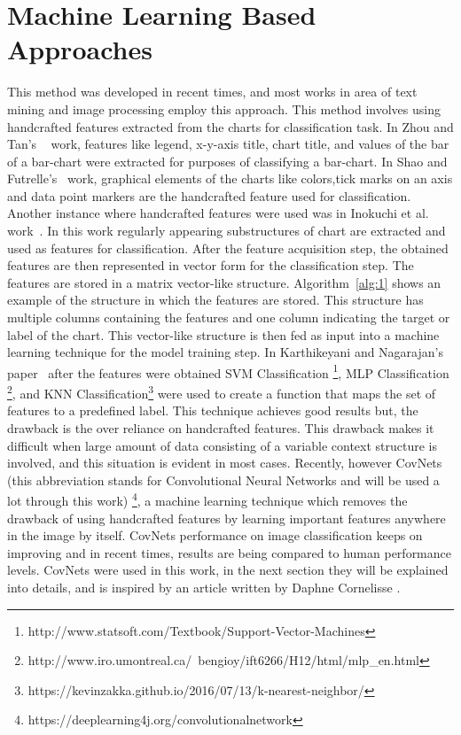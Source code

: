 \documentclass[12pt, a4paper,oneside]{report}
\begin{document}
\section{Machine Learning Based Approaches}
This method was developed in recent times, and most works in area of text mining and image processing employ this approach. This method 
involves using handcrafted features extracted from the charts for classification task. In Zhou and Tan's ~\cite{zhou2000bar} work, features like legend, x-y-axis title, chart title, and values of the bar of a bar-chart were extracted for purposes of classifying a bar-chart. In Shao and  Futrelle's~\cite{shao2005recognition} work, graphical elements of the charts like colors,tick marks on an axis and data point markers are the handcrafted feature used for classification. Another instance where handcrafted features were used was in Inokuchi et al. work~\cite{inokuchi2000apriori}. In this work regularly appearing substructures of chart are extracted and used as features for classification. After the feature acquisition step, the obtained features are then represented in vector form for the classification step. The features are stored in a matrix vector-like structure. Algorithm~\ref{alg:1} shows an example of the structure in which the features are stored. This structure has multiple columns containing the features and one column indicating the target or label of the chart. This vector-like structure is then fed as input into a machine learning technique for the model training step. In Karthikeyani and Nagarajan's paper~\cite{karthikeyani2012machine} after the features were obtained SVM Classification \footnote{http://www.statsoft.com/Textbook/Support-Vector-Machines}, MLP Classification
\footnote{http://www.iro.umontreal.ca/~bengioy/ift6266/H12/html/mlp\_en.html}, and  KNN Classification\footnote{
https://kevinzakka.github.io/2016/07/13/k-nearest-neighbor/} were used to create a function that maps the set of features to a predefined label. This technique achieves good results but, the drawback is the over reliance on handcrafted features. This drawback makes it difficult when large amount of data consisting of a variable context structure is involved, and this situation is evident in most cases. Recently, however CovNets (this abbreviation stands for Convolutional Neural Networks and will be used a lot through this work) \footnote{https://deeplearning4j.org/convolutionalnetwork}, a machine learning technique which removes the drawback of using handcrafted features by learning important features anywhere in the image by itself. CovNets performance on image classification keeps on improving and in recent times, results are being compared to human performance levels. CovNets were used in this work, in the next section they will be explained into details, and is inspired by an article written by Daphne Cornelisse \cite{covnet}.\newline
\end{document}
